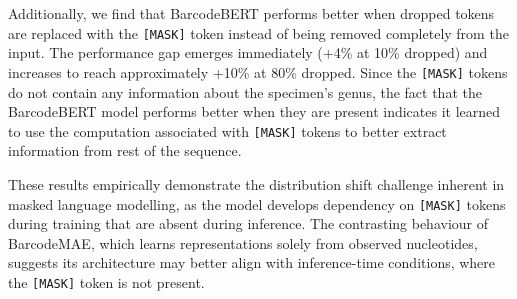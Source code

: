 Additionally, we find that BarcodeBERT performs better when dropped tokens are replaced with the \texttt{[MASK]} token instead of being removed completely from the input. The performance gap emerges immediately (+4\% at 10\% dropped) and increases to reach approximately +10\% at 80\% dropped.
Since the \texttt{[MASK]} tokens do not contain any information about the specimen's genus, the fact that the BarcodeBERT model performs better when they are present indicates it learned to use the computation associated with \texttt{[MASK]} tokens to better extract information from rest of the sequence.

These results empirically demonstrate the distribution shift challenge inherent in masked language modelling, as the model develops dependency on \texttt{[MASK]} tokens during training that are absent during inference. The contrasting behaviour of BarcodeMAE, which learns representations solely from observed nucleotides, suggests its architecture may better align with inference-time conditions, where the \texttt{[MASK]} token is not present. 
